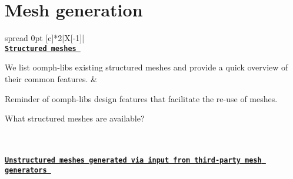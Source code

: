 \label{_meshes}%
\section*{Mesh generation}

\tabulinesep=1mm
\begin{longtabu} spread 0pt [c]{*{2}{|X[-1]}|}
\hline
{}\\
{\bfseries  \href{../../meshes/mesh_list/html/index.html}{\tt Structured meshes } }

We list {\ttfamily oomph-\/lib\textquotesingle{}s} existing structured meshes and provide a quick overview of their common features.  &
\begin{DoxyItemize}
\item Reminder of {\ttfamily oomph-\/lib\textquotesingle{}s} design features that facilitate the re-\/use of meshes.
\item What structured meshes are available?
\end{DoxyItemize}

\\
\\
{\bfseries  \label{_third_party_meshes}%
 \href{../../meshes/third_party_meshes/html/index.html}{\tt Unstructured meshes generated via input from third-\/party mesh generators }  }


\end{longtabu}
